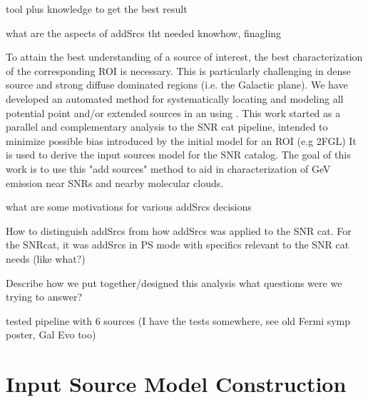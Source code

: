 {tool plus knowledge to get the best result

what are the aspects of addSrcs tht needed knowhow, finagling


To attain the best understanding of a source of interest, the best characterization of the corresponding ROI is necessary. This is particularly challenging in dense source and strong diffuse dominated regions (i.e. the Galactic plane). We have developed an automated method for systematically locating and modeling all potential point and/or extended sources in an \roi{} using \ptlike{}. This work started as a parallel and complementary analysis to the SNR cat pipeline, intended to minimize possible bias introduced by the initial model for an ROI (e.g 2FGL) It is  used to derive the input sources model for the SNR catalog. The goal of this work is to use this "add sources" method to aid in characterization of GeV emission near SNRs and nearby molecular clouds.

what are some motivations for various addSrcs decisions 

How to distinguish addSrcs from how addSrcs was applied to the SNR cat. For the SNRcat, it was addSrcs in PS mode with specifics relevant to the SNR cat needs (like what?)


Describe how we put together/designed this analysis what questions were we trying to answer?


tested pipeline with 6 sources (I have the tests somewhere, see old Fermi symp poster, Gal Evo too)
\section{Input Source Model Construction}\label{snrCat:AddSrcs}



}
